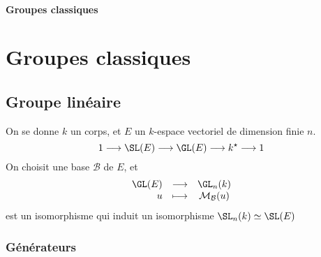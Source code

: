 \ifsolo
    ~

    \vspace{1cm}

    \begin{center}
        \textbf{\LARGE Groupes classiques} \\[1em]
    \end{center}
    \tableofcontents
\else
    \chapter{Groupes classiques}

    \minitoc
\fi
\thispagestyle{empty}

\section{Groupe linéaire}

On se donne $k$ un corps, et  $E$ un  $k$-espace vectoriel de dimension finie  $n$.  \[
    1 \longrightarrow  \SL(E) \longrightarrow \GL(E)\longrightarrow k^\star \longrightarrow 1
\] 
On choisit une base $\mathcal  B$ de $E$, et  \[
\begin{array}{rrcl}
    \GL(E) & \longrightarrow & \GL_n(k) \\
    u & \longmapsto & \displaystyle \mathcal  M_{\mathcal  B}(u)
\end{array}
\] 
est un isomorphisme qui induit un isomorphisme $\SL_n(k)\simeq \SL(E)$

\subsection{Générateurs}
